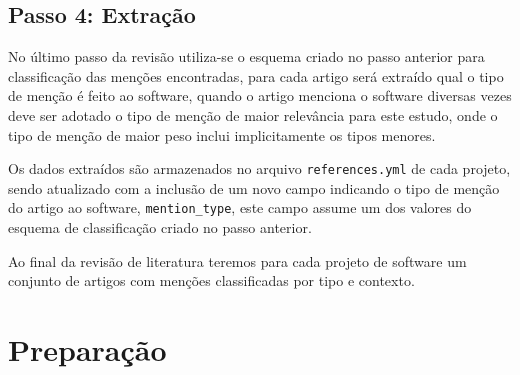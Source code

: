 

\subsection{Passo 4: Extração}

No último passo da revisão utiliza-se o esquema criado no passo anterior para
classificação das menções encontradas, para cada artigo será extraído qual o
tipo de menção é feito ao software, quando o artigo menciona o software
diversas vezes deve ser adotado o tipo de menção de maior relevância para este
estudo, onde o tipo de menção de maior peso inclui implicitamente os tipos
menores.


Os dados extraídos são armazenados no arquivo \texttt{references.yml} de
cada projeto, sendo atualizado com a inclusão de um novo campo indicando o tipo
de menção do artigo ao software, \texttt{mention\_type}, este campo assume um dos
valores do esquema de classificação criado no passo anterior.

Ao final da revisão de literatura teremos para cada projeto de software um
conjunto de artigos com menções classificadas por tipo e contexto.




\section{Preparação} \label{estudo2:preparacao} %

